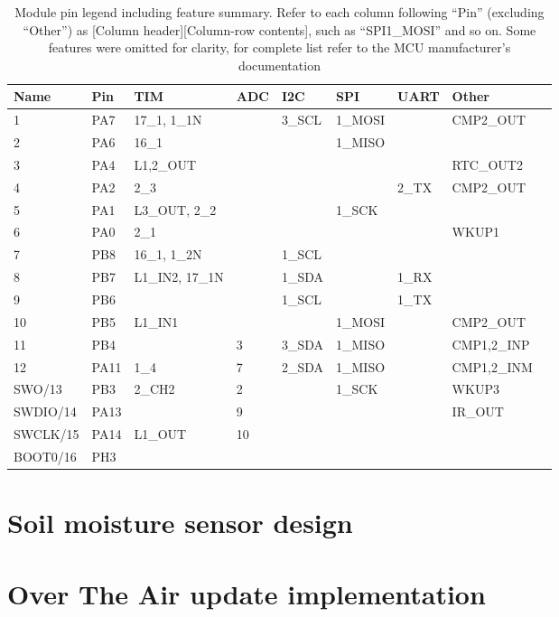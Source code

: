 \begin{table}[H]
\begin{center}
\caption{\label{table:module-pin-legend}Module pin legend including feature summary. Refer to each column following ``Pin'' (excluding ``Other'') as [Column header][Column-row contents], such as ``SPI1\_MOSI'' and so on. Some features were omitted for clarity, for complete list refer to the MCU manufacturer's documentation}
    \begin{tabular}{|l|l|l|l|l|l|l|l|l|} \hline
    \textbf{Name} & \textbf{Pin} & \textbf{TIM} & \textbf{ADC} & \textbf{I2C} & \textbf{SPI} & \textbf{UART} & \textbf{Other}\\ \hline
    1        & PA7  & 17\_1, 1\_1N    &     & 3\_SCL & 1\_MOSI &             & CMP2\_OUT          \\ \hline
    2        & PA6  & 16\_1          &     &       & 1\_MISO &             &                    \\ \hline
    3        & PA4  & L1,2\_OUT      &     &       &        &             & RTC\_OUT2           \\ \hline
    4        & PA2  & 2\_3           &     &       &        & 2\_TX & CMP2\_OUT           \\ \hline
    5        & PA1  & L3\_OUT, 2\_2   &     &       & 1\_SCK  &             &                    \\ \hline
    6        & PA0  & 2\_1           &     &       &        &             & WKUP1   \\ \hline
    7        & PB8  & 16\_1, 1\_2N    &     & 1\_SCL &        &             &                    \\ \hline
    8        & PB7  & L1\_IN2, 17\_1N &     & 1\_SDA &        & 1\_RX        &                    \\ \hline
    9        & PB6  &               &     & 1\_SCL &        & 1\_TX        &                    \\ \hline
    10       & PB5  & L1\_IN1        &     &       & 1\_MOSI &             & CMP2\_OUT          \\ \hline
    11       & PB4  &               & 3   & 3\_SDA & 1\_MISO &             & CMP1,2\_INP        \\ \hline
    12       & PA11 & 1\_4           & 7   & 2\_SDA & 1\_MISO &             & CMP1,2\_INM        \\ \hline
    SWO/13   & PB3  & 2\_CH2         & 2   &       & 1\_SCK  &             & WKUP3 \\ \hline
    SWDIO/14 & PA13 &               & 9   &       &        &             & IR\_OUT             \\ \hline
    SWCLK/15 & PA14 & L1\_OUT        & 10  &       &        &             &                    \\ \hline
    BOOT0/16 & PH3  &               &     &       &        &             &                    \\ \hline
    \end{tabular}
\end{center}
\end{table}

\section{Soil moisture sensor design}

\section{Over The Air update implementation}

